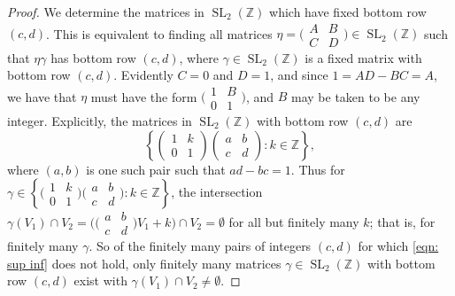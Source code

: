 \documentclass[10pt,leqno,twoside,b5paper]{article}
\theoremstyle{plain}
\theoremstyle{definition}
\numberwithin{equation}{section}
\numberwithin{lem}{section}
\newcommand{\cbr}[1]{\left\{#1\right\}}
\DeclareMathOperator{\SL}{SL}
\newcommand{\slz}{\SL_2(\mathbb{Z})}
\begin{document}
\begin{proof}
    We determine the matrices in $\slz$ which have fixed bottom row $(c,d)$. This is equivalent to finding all matrices $\eta = \big(\!\begin{smallmatrix}
        A & B \\ C & D
    \end{smallmatrix}\!\big)\in \slz$ such that $\eta\gamma$ has bottom row $(c,d)$, where $\gamma\in \slz$ is a fixed matrix with  bottom row $(c,d)$. Evidently $C=0$ and $D = 1$, and since $1 = AD - BC = A$, we have that $\eta$ must have the form $\big(\!\begin{smallmatrix}
        1 & B \\ 0  & 1
    \end{smallmatrix}\!\big)$, and $B$ may be taken to be any integer. Explicitly, the matrices in $\slz$ with bottom row $(c,d)$ are \[\cbr{\begin{pmatrix}
        1 & k \\ 0 & 1
    \end{pmatrix}\begin{pmatrix}
        a & b \\ c & d
    \end{pmatrix}: k\in \mathbb{Z}},\]
    where $(a,b)$ is one such pair such that $ad-bc = 1$. Thus for $\gamma\in \cbr{\big(\!\begin{smallmatrix}
        1 & k \\ 0 & 1
    \end{smallmatrix}\!\big)\big(\!\begin{smallmatrix}
        a & b \\ c & d
    \end{smallmatrix}\!\big): k\in \mathbb{Z}}$, the intersection $\gamma(V_1)\cap V_2 = \big(\big(\!\begin{smallmatrix}
        a & b \\ c & d
    \end{smallmatrix}\!\big)V_1+ k\big)\cap V_2 =\emptyset$ for all but finitely many $k$; that is, for finitely many $\gamma$. So of the finitely many pairs of integers $(c,d)$ for which \cref{eqn: sup inf} does not hold, only finitely many matrices $\gamma\in \slz$ with bottom row $(c,d)$ exist with $\gamma(V_1)\cap V_2\neq \emptyset$.


\end{proof}
\end{document}
